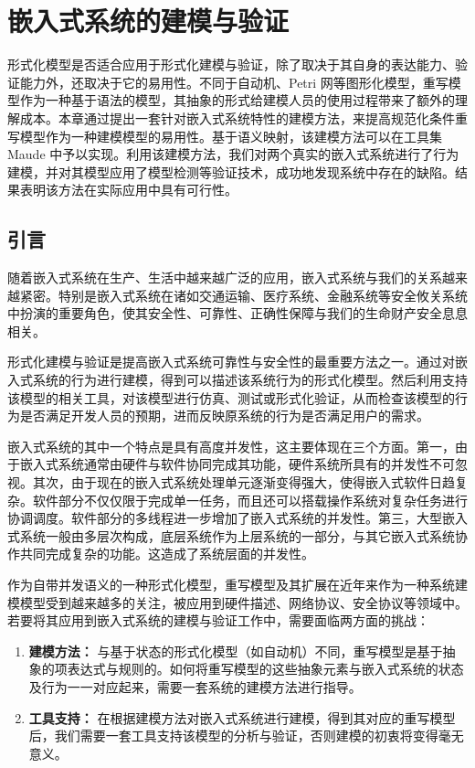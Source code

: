 \chapter{嵌入式系统的建模与验证}
\label{cha:modeling}

形式化模型是否适合应用于形式化建模与验证，除了取决于其自身的表达能力、验证能力外，还取决于它的易用性。不同于自动机、Petri 网等图形化模型，重写模型作为一种基于语法的模型，其抽象的形式给建模人员的使用过程带来了额外的理解成本。本章通过提出一套针对嵌入式系统特性的建模方法，来提高规范化条件重写模型作为一种建模模型的易用性。基于语义映射，该建模方法可以在工具集 Maude 中予以实现。利用该建模方法，我们对两个真实的嵌入式系统进行了行为建模，并对其模型应用了模型检测等验证技术，成功地发现系统中存在的缺陷。结果表明该方法在实际应用中具有可行性。

\section{引言}

随着嵌入式系统在生产、生活中越来越广泛的应用，嵌入式系统与我们的关系越来越紧密。特别是嵌入式系统在诸如交通运输、医疗系统、金融系统等安全攸关系统中扮演的重要角色，使其安全性、可靠性、正确性保障与我们的生命财产安全息息相关。

形式化建模与验证是提高嵌入式系统可靠性与安全性的最重要方法之一。通过对嵌入式系统的行为进行建模，得到可以描述该系统行为的形式化模型。然后利用支持该模型的相关工具，对该模型进行仿真、测试或形式化验证，从而检查该模型的行为是否满足开发人员的预期，进而反映原系统的行为是否满足用户的需求。

嵌入式系统的其中一个特点是具有高度并发性，这主要体现在三个方面。第一，由于嵌入式系统通常由硬件与软件协同完成其功能，硬件系统所具有的并发性不可忽视。其次，由于现在的嵌入式系统处理单元逐渐变得强大，使得嵌入式软件日趋复杂。软件部分不仅仅限于完成单一任务，而且还可以搭载操作系统对复杂任务进行协调调度。软件部分的多线程进一步增加了嵌入式系统的并发性。第三，大型嵌入式系统一般由多层次构成，底层系统作为上层系统的一部分，与其它嵌入式系统协作共同完成复杂的功能。这造成了系统层面的并发性。

作为自带并发语义的一种形式化模型，重写模型及其扩展在近年来作为一种系统建模模型受到越来越多的关注，被应用到硬件描述、网络协议、安全协议等领域中。若要将其应用到嵌入式系统的建模与验证工作中，需要面临两方面的挑战：
\begin{enumerate}
\item \textbf{建模方法：} 与基于状态的形式化模型（如自动机）不同，重写模型是基于抽象的项表达式与规则的。如何将重写模型的这些抽象元素与嵌入式系统的状态及行为一一对应起来，需要一套系统的建模方法进行指导。
\item \textbf{工具支持：} 在根据建模方法对嵌入式系统进行建模，得到其对应的重写模型后，我们需要一套工具支持该模型的分析与验证，否则建模的初衷将变得毫无意义。
\end{enumerate}

